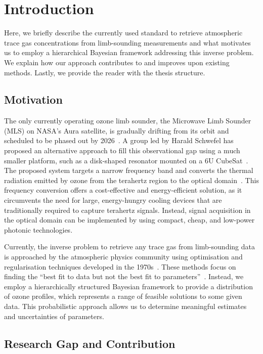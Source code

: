 \chapter{Introduction}
Here, we briefly describe the currently used standard to retrieve atmospheric trace gas concentrations from limb-sounding measurements and what motivates us to employ a hierarchical Bayesian framework addressing this inverse problem.
We explain how our approach contributes to and improves upon existing methods.
Lastly, we provide the reader with the thesis structure.


\section{Motivation}
The only currently operating ozone limb sounder, the Microwave Limb Sounder (MLS) on NASA's Aura satellite, is gradually drifting from its orbit and scheduled to be phased out by 2026~\cite{Bryan2024NASA}.
A group led by Harald Schwefel has proposed an alternative approach to fill this observational gap using a much smaller platform, such as a disk-shaped resonator mounted on a 6U CubeSat~\cite{ustin2024current}. 
The proposed system targets a narrow frequency band and converts the thermal radiation emitted by ozone from the terahertz region to the optical domain~\cite{Suresh25,Sedlmeir14}. 
This frequency conversion offers a cost-effective and energy-efficient solution, as it circumvents the need for large, energy-hungry cooling devices that are traditionally required to capture terahertz signals. 
Instead, signal acquisition in the optical domain can be implemented by using compact, cheap, and low-power photonic technologies.

Currently, the inverse problem to retrieve any trace gas from limb-sounding data is approached by the atmospheric physics community using optimisation and regularisation techniques developed in the 1970s~\cite{rodgers1976retrieval, NASA2022MLSv5}.
These methods focus on finding the ``best fit to data but not the best fit to parameters''~\cite{tan2016LecNot}.
Instead, we employ a hierarchically structured Bayesian framework to provide a distribution of ozone profiles, which represents a range of feasible solutions to some given data.
This probabilistic approach allows us to determine meaningful estimates and uncertainties of parameters.

\section{Research Gap and Contribution}

